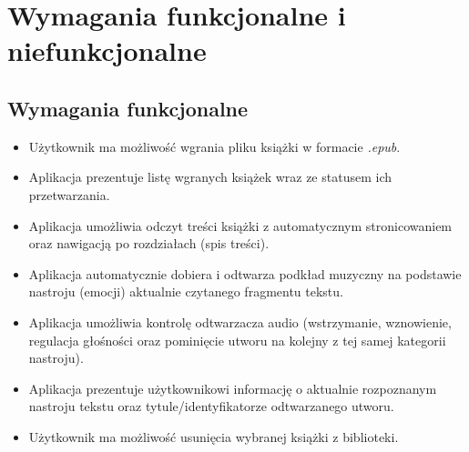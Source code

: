 \section{Wymagania funkcjonalne i niefunkcjonalne}
\subsection{Wymagania funkcjonalne}
\begin{itemize}
      \item[\textbf{FU1:}] Użytkownik ma możliwość wgrania pliku książki w formacie \textit{.epub}.
      \item[\textbf{FU2:}] Aplikacja prezentuje listę wgranych książek wraz ze statusem ich przetwarzania.
      \item[\textbf{FU3:}] Aplikacja umożliwia odczyt treści książki z automatycznym stronicowaniem oraz
      nawigacją po rozdziałach (spis treści).
      \item[\textbf{FU4:}] Aplikacja automatycznie dobiera i odtwarza podkład muzyczny na podstawie nastroju
      (emocji) aktualnie czytanego fragmentu tekstu.
      \item[\textbf{FU5:}] Aplikacja umożliwia kontrolę odtwarzacza audio (wstrzymanie, wznowienie, regulacja
      głośności oraz pominięcie utworu na kolejny z tej samej kategorii nastroju).
      \item[\textbf{FU6:}] Aplikacja prezentuje użytkownikowi informację o aktualnie rozpoznanym nastroju tekstu
      oraz tytule/identyfikatorze odtwarzanego utworu.
      \item[\textbf{FU7:}] Użytkownik ma możliwość usunięcia wybranej książki z biblioteki.
\end{itemize}

